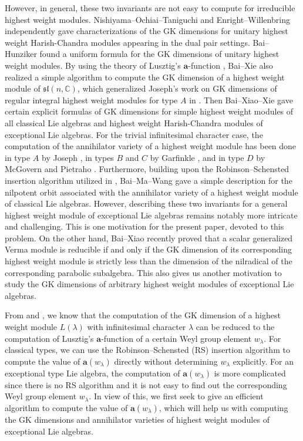 \documentclass[reqno,12pt]{amsart}
\numberwithin{equation}{section}
\theoremstyle{plain}
\theoremstyle{definition}
\newcommand{\lam}{\lambda}
\newcommand{\aff}{ \mathbf{a} }
\begin{document}
 
However, in general,  these two invariants are not  easy to compute for irreducible highest weight modules. 
Nishiyama--Ochiai--Taniguchi  \cite{NOT} and Enright--Willenbring \cite{EW} independently gave characterizations of the GK dimensions  for unitary highest weight Harish-Chandra modules appearing in the dual pair settings. Bai--Hunziker \cite{Bai-Hu} found a uniform formula for the GK dimensions of   unitary highest weight modules.
By using the theory of Lusztig's $\aff$-function  \cite{lusztig1977symbol, Lu79,Lusztig1982A-class-II, lusztig1984char,lusztig1985cellsI,lusztig1985A_n}, Bai--Xie  \cite{BX} also realized a simple algorithm to compute the GK dimension of a highest weight module of $\mathfrak{sl}(n,\mathbb{C})$, which generalized Joseph's work on  GK dimensions of regular integral highest weight modules for type $A$ in \cite{Jo78}.
 Then Bai--Xiao--Xie \cite{BXX} gave certain explicit formulas of GK dimensions for simple highest weight modules of all classical Lie algebras and highest weight Harish-Chandra modules of exceptional Lie algebras.  
For the trivial infinitesimal 
character case, the computation of the annihilator variety of a highest weight module  has been done in type $A$ by Joseph \cite{Jo-com}, in types $B$ 
and $C$ by Garfinkle \cite{Garfinkle3}, and in type $D$ by McGovern and Pietraho 
\cite{MP23}. 
 Furthermore, building upon the Robinson--Schensted insertion algorithm utilized in \cite{BX,BXX}, Bai--Ma--Wang \cite{BMW} gave a simple description for the nilpotent orbit associated with the annihilator variety of a highest weight module of classical Lie algebras. However, describing these two invariants for a general highest weight module of  exceptional Lie algebras remains notably more intricate and challenging. This is one motivation for the present paper, devoted to this problem. On the other hand, Bai--Xiao \cite{BXiao} recently proved that a scalar generalized Verma module is reducible if and only if the GK dimension of its corresponding highest weight module is strictly less than the dimension of the nilradical of the corresponding parabolic subalgebra.   This also gives us another motivation to study the GK dimensions of arbitrary highest weight modules of exceptional Lie algebras.



From  \cite{BX} and \cite{BXX}, we know that the computation of the GK dimension of a highest weight module $L(\lam)$ with infinitesimal character $\lam$ can be reduced to the computation of Lusztig's $\aff$-function of a certain Weyl group element $w_{\lam}$.  For classical types, we can use the Robinson--Schensted (RS) insertion algorithm to compute the value of $\aff(w_{\lam})$ directly without determining $w_{\lam}$ explicitly. For an exceptional type Lie algebra, the computation of $\aff(w_{\lam})$ is more complicated since there is no RS algorithm and it is not easy to find out the corresponding Weyl group element $w_{\lam}$. In view of this, we first seek to give an efficient algorithm to compute the value of $\aff(w_{\lam})$, which will help us with computing the GK dimensions and annihilator varieties of  highest weight modules of exceptional Lie algebras.
\end{document}
